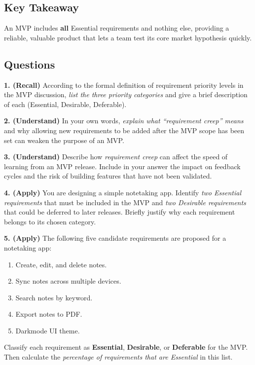 \documentclass[12pt, a4paper]{article}
\begin{document}
\subsection{Key Takeaway}
An MVP includes \textbf{all} Essential requirements and nothing else, providing a reliable, valuable product that lets a team test its core market hypothesis quickly.  

\subsection*{Questions}
\newpage
\textbf{1. (Recall)} According to the formal definition of requirement priority levels in the MVP discussion, \emph{list the three priority categories} and give a brief description of each (Essential, Desirable, Deferable).  

\newpage
\textbf{2. (Understand)} In your own words, \emph{explain what ``requirement creep'' means} and why allowing new requirements to be added after the MVP scope has been set can weaken the purpose of an MVP.  

\newpage
\textbf{3. (Understand)} Describe how \emph{requirement creep} can affect the speed of learning from an MVP release. Include in your answer the impact on feedback cycles and the risk of building features that have not been validated.  

\newpage
\textbf{4. (Apply)} You are designing a simple notetaking app.  
Identify \emph{two Essential requirements} that must be included in the MVP and \emph{two Desirable requirements} that could be deferred to later releases. Briefly justify why each requirement belongs to its chosen category.  

\newpage
\textbf{5. (Apply)} The following five candidate requirements are proposed for a notetaking app:

\begin{enumerate}
  \item Create, edit, and delete notes.  
  \item Sync notes across multiple devices.  
  \item Search notes by keyword.  
  \item Export notes to PDF.  
  \item Darkmode UI theme.
\end{enumerate}

Classify each requirement as \textbf{Essential}, \textbf{Desirable}, or \textbf{Deferable} for the MVP. Then calculate the \emph{percentage of requirements that are Essential} in this list.  
\end{document}
